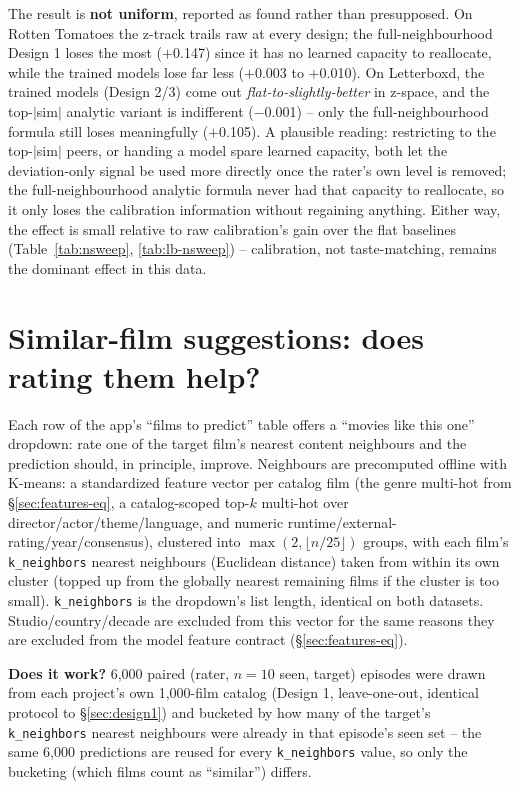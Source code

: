 \documentclass[11pt]{article}
\begin{document}
The result is \textbf{not uniform}, reported as found rather than presupposed. On Rotten Tomatoes the z-track trails raw at every design; the full-neighbourhood Design 1 loses the most ($+$0.147) since it has no learned capacity to reallocate, while the trained models lose far less ($+$0.003 to $+$0.010). On Letterboxd, the trained models (Design 2/3) come out \emph{flat-to-slightly-better} in z-space, and the top-$|$sim$|$ analytic variant is indifferent ($-$0.001) -- only the full-neighbourhood formula still loses meaningfully ($+$0.105). A plausible reading: restricting to the top-$|$sim$|$ peers, or handing a model spare learned capacity, both let the deviation-only signal be used more directly once the rater's own level is removed; the full-neighbourhood analytic formula never had that capacity to reallocate, so it only loses the calibration information without regaining anything. Either way, the effect is small relative to raw calibration's gain over the flat baselines (Table~\ref{tab:nsweep}, \ref{tab:lb-nsweep}) -- calibration, not taste-matching, remains the dominant effect in this data.

\section{Similar-film suggestions: does rating them help?}
\label{sec:similar}

Each row of the app's ``films to predict'' table offers a ``movies like this one'' dropdown: rate one of the target film's nearest content neighbours and the prediction should, in principle, improve. Neighbours are precomputed offline with K-means: a standardized feature vector per catalog film (the genre multi-hot from \S\ref{sec:features-eq}, a catalog-scoped top-$k$ multi-hot over director/actor/theme/language, and numeric runtime/external-rating/year/consensus), clustered into $\max(2,\lfloor n/25\rfloor)$ groups, with each film's \texttt{k\_neighbors} nearest neighbours (Euclidean distance) taken from within its own cluster (topped up from the globally nearest remaining films if the cluster is too small). \texttt{k\_neighbors} is the dropdown's list length, identical on both datasets. Studio/country/decade are excluded from this vector for the same reasons they are excluded from the model feature contract (\S\ref{sec:features-eq}).

\textbf{Does it work?} 6{,}000 paired (rater, $n{=}10$ seen, target) episodes were drawn from each project's own 1{,}000-film catalog (Design 1, leave-one-out, identical protocol to \S\ref{sec:design1}) and bucketed by how many of the target's \texttt{k\_neighbors} nearest neighbours were already in that episode's seen set -- the same 6{,}000 predictions are reused for every \texttt{k\_neighbors} value, so only the bucketing (which films count as ``similar'') differs.
\end{document}
